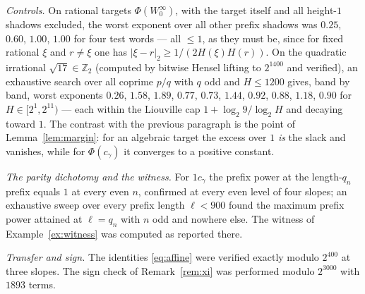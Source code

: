 \documentclass[11pt,reqno]{amsart}
\theoremstyle{plain}
\theoremstyle{definition}
\newcommand{\Z}{\mathbb{Z}}
\newcommand{\Zt}{\Z_2}
\newcommand{\PH}{\Phi}
\begin{document}
\emph{Controls.} On rational targets $\PH(W_0^{\infty})$, with the target itself and all height-$1$
shadows excluded, the worst exponent over all other prefix shadows was $0.25$, $0.60$, $1.00$,
$1.00$ for four test words --- all $\le1$, as they must be, since for fixed rational $\xi$ and
$r\ne\xi$ one has $|\xi-r|_2\ge1/(2H(\xi)H(r))$. On the quadratic irrational $\sqrt{17}\in\Zt$
(computed by bitwise Hensel lifting to $2^{1400}$ and verified), an exhaustive search over all
coprime $p/q$ with $q$ odd and $H\le1200$ gives, band by band, worst exponents
$0.26$, $1.58$, $1.89$, $0.77$, $0.73$, $1.44$, $0.92$, $0.88$, $1.18$, $0.90$ for
$H\in[2^{1},2^{11})$ --- each within the Liouville cap $1+\log_2 9/\log_2 H$ and decaying toward
$1$. The contrast with the previous paragraph is the point of Lemma~\ref{lem:margin}: for an
algebraic target the excess over $1$ \emph{is} the slack and vanishes, while for $\PH(c_\gamma)$ it
converges to a positive constant.

\emph{The parity dichotomy and the witness.} For $1c_\gamma$ the prefix power at the length-$q_n$
prefix equals $1$ at every even $n$, confirmed at every even level of four slopes; an exhaustive
sweep over every prefix length $\ell<900$ found the maximum prefix power attained at $\ell=q_n$ with
$n$ odd and nowhere else. The witness of Example~\ref{ex:witness} was computed as reported there.

\emph{Transfer and sign.} The identities \eqref{eq:affine} were verified exactly modulo $2^{400}$ at
three slopes. The sign check of Remark~\ref{rem:xi} was performed modulo $2^{3000}$ with $1893$
terms.
\end{document}
